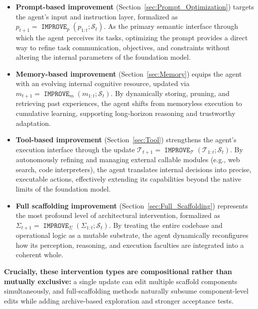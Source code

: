 \documentclass{article}
\newcommand{\IMPROVE}{\operatorname{\mathtt{IMPROVE}}}
\begin{document}
\begin{itemize}[leftmargin=*]
    \item \textbf{Prompt-based improvement} (Section~\ref{sec:Prompt_Optimization}) targets the agent's input and instruction layer, formalized as $p_{t+1}=\IMPROVE_{p}(p_{1:t};\mathcal{S}_t)$.  As the primary semantic interface through which the agent perceives its tasks, optimizing the prompt provides a direct way to refine task communication, objectives, and constraints without altering the internal parameters of the foundation model.

    
    \item \textbf{Memory-based improvement} (Section~\ref{sec:Memory}) equips the agent with an evolving internal cognitive resource, updated via $m_{t+1}=\IMPROVE_{m}(m_{1:t};\mathcal{S}_t)$. 
    By dynamically storing, pruning, and retrieving past experiences, the agent shifts from memoryless execution to cumulative learning, supporting long-horizon reasoning and trustworthy adaptation.  

    
    \item \textbf{Tool-based improvement} (Section~\ref{sec:Tool}) strengthens the agent's execution interface through the update $\mathcal{T}_{t+1}=\IMPROVE_{\mathcal{T}}(\mathcal{T}_{1:t};\mathcal{S}_t)$. 
    By autonomously refining and managing external callable modules (e.g., web search, code interpreters), the agent translates internal decisions into precise, executable actions, effectively extending its capabilities beyond the native limits of the foundation model.

    
    \item \textbf{Full scaffolding improvement} (Section~\ref{sec:Full_Scaffolding}) represents the most profound level of architectural intervention, formalized as $\Sigma_{t+1}=\IMPROVE_{\Sigma}(\Sigma_{1:t};\mathcal{S}_t)$. 
    By treating the entire codebase and operational logic as a mutable substrate, the agent dynamically reconfigures how its perception, reasoning, and execution faculties are integrated into a coherent whole.
\end{itemize}

\textbf{Crucially, these intervention types are compositional rather than mutually exclusive:} a single update can edit multiple scaffold components simultaneously, and full-scaffolding methods naturally subsume component-level edits while adding archive-based exploration and stronger acceptance tests.


\end{document}

